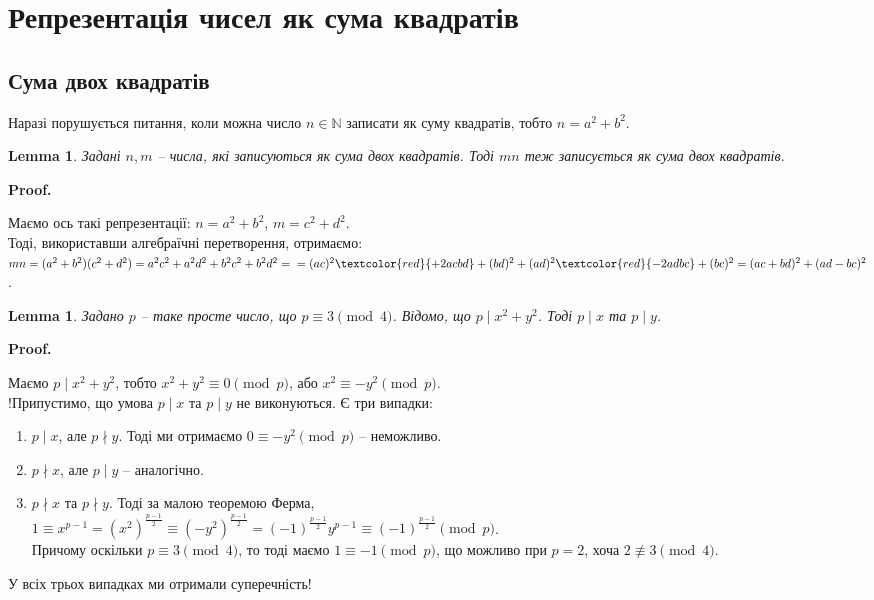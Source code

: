 \documentclass[a4paper, 10pt]{article}
\makeatletter
\theoremstyle{theoremdd}
\theoremstyle{theoremdd}
\theoremstyle{theoremdd}
\theoremstyle{theoremdd}
\theoremstyle{theoremdd}
\theoremstyle{theoremdd}
\theoremstyle{theoremdd}
\newtheorem{lemma}[theorem]{Lemma}
\theoremstyle{theoremdd}
\renewenvironment{proof}[1][Proof.\\]{\par
\pushQED{\hfill \qed}%
\normalfont \topsep6\p@\@plus6\p@\relax
\trivlist
\item\relax
{\bfseries
#1\@addpunct{.}}\hspace\labelsep\ignorespaces
}{%
\popQED\endtrivlist\@endpefalse
}
\makeatother
\begin{document}
\section{Репрезентація чисел як сума квадратів}
\subsection{Сума двох квадратів}
Наразі порушується питання, коли можна число $n \in \mathbb{N}$ записати як суму квадратів, тобто $n = a^2+b^2$.

\begin{lemma}
Задані $n,m$ -- числа, які записуються як сума двох квадратів. Тоді $mn$ теж записується як сума двох квадратів.
\end{lemma}

\begin{proof}
Маємо ось такі репрезентації: $n = a^2+b^2$, \quad $m = c^2+d^2$.\\
Тоді, використавши алгебраїчні перетворення, отримаємо:\\
$mn = (a^2+b^2)(c^2+d^2) = a^2c^2+a^2d^2+b^2c^2+b^2d^2 = \\
= (ac)^2 \textcolor{red}{+ 2acbd} + (bd)^2 + (ad)^2 \textcolor{red}{-2adbc} + (bc)^2 = (ac+bd)^2 + (ad-bc)^2$.
\end{proof}

\begin{lemma}
Задано $p$ -- таке просте число, що $p \equiv 3 \pmod 4$. Відомо, що $p \mid x^2+y^2$. Тоді $p \mid x$ та $p \mid y$.
\end{lemma}

\begin{proof}
Маємо $p \mid x^2+y^2$, тобто $x^2 + y^2 \equiv 0 \pmod p$, або $x^2 \equiv -y^2 \pmod p$.\\
!Припустимо, що умова $p \mid x$ та $p \mid y$ не виконуються. Є три випадки:
\begin{enumerate}[nosep,wide=0pt,label={\Roman*.}]
\item $p \mid x$, але $p \nmid y$. Тоді ми отримаємо $0 \equiv -y^2 \pmod p$ -- неможливо.
\item $p \nmid x$, але $p \mid y$ -- аналогічно.
\item $p \nmid x$ та $p \nmid y$. Тоді за малою теоремою Ферма,\\
$1 \equiv x^{p-1} = \left(x^2\right)^{\textstyle\frac{p-1}{2}} \equiv \left(-y^2\right)^{\textstyle\frac{p-1}{2}} = (-1)^{\textstyle\frac{p-1}{2}}y^{p-1} \equiv (-1)^{\textstyle\frac{p-1}{2}} \pmod p$.\\
Причому оскільки $p \equiv 3 \pmod 4$, то тоді маємо $1 \equiv - 1 \pmod p$, що можливо при $p = 2$, хоча $2 \not\equiv 3 \pmod 4$.
\end{enumerate}
У всіх трьох випадках ми отримали суперечність!
\end{proof}
\end{document}

